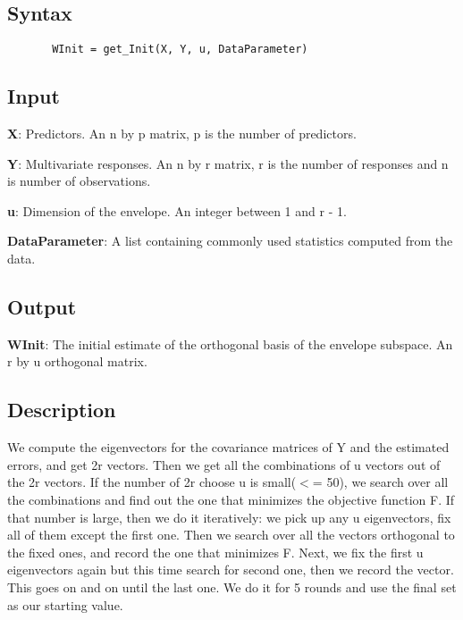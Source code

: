 \documentclass[a4paper,11pt,openany]{memoir}
\begin{document}
\subsection*{Syntax}


\begin{verbatim}       WInit = get_Init(X, Y, u, DataParameter)\end{verbatim}
    

\subsection*{Input}

\begin{par}
\textbf{X}: Predictors. An n by p matrix, p is the number of predictors.
\end{par} \vspace{1em}
\begin{par}
\textbf{Y}: Multivariate responses. An n by r matrix, r is the number of responses and n is number of observations.
\end{par} \vspace{1em}
\begin{par}
\textbf{u}: Dimension of the envelope. An integer between 1 and r - 1.
\end{par} \vspace{1em}
\begin{par}
\textbf{DataParameter}: A list containing commonly used statistics computed from the data.
\end{par} \vspace{1em}


\subsection*{Output}

\begin{par}
\textbf{WInit}: The initial estimate of the orthogonal basis of the envelope subspace. An r by u orthogonal matrix.
\end{par} \vspace{1em}


\subsection*{Description}

\begin{par}
We compute the eigenvectors for the covariance matrices of Y and the estimated errors, and get 2r vectors.  Then we get all the combinations of u vectors out of the 2r vectors. If the number of 2r choose u is small(\ensuremath{<}= 50), we search over all the combinations and find out the one that minimizes the objective function F. If that number is large, then we do it iteratively: we pick up any u eigenvectors, fix all of them except the first one. Then we search over all the vectors orthogonal to the fixed ones, and record the one that minimizes F. Next, we fix the first u eigenvectors again but this time search for second one, then we record the vector. This goes on and on until the last one. We do it for 5 rounds and use the final set as our starting value.
\end{par} \vspace{1em}
\end{document}
